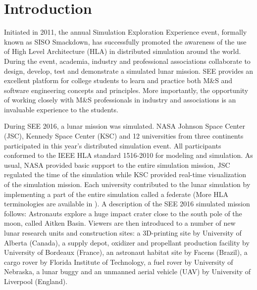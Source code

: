 \documentclass[conference]{IEEEtran}
\begin{document}
%
\IEEEpeerreviewmaketitle

\section{Introduction}
Initiated in 2011, the annual Simulation Exploration Experience event, formally known as SISO Smackdown, has successfully promoted the awareness of the use of High Level Architecture (HLA) in distributed simulation around the world. During the event, academia, industry and professional associations collaborate to design, develop, test and demonstrate a simulated lunar mission. SEE provides an excellent platform for college students to learn and practice both M\&S and software engineering concepts and principles. More importantly, the opportunity of working closely with M\&S professionals in industry and associations is an invaluable experience to the students. 

During SEE 2016, a lunar mission was simulated. NASA Johnson Space Center (JSC), Kennedy Space Center (KSC) and 12 universities from three continents participated in this year\rq{}s distributed simulation event. All participants conformed to the IEEE HLA standard 1516-2010 for modeling and simulation. As usual, NASA provided basic support to the entire simulation mission, JSC regulated the time of the simulation while KSC provided real-time visualization of the simulation mission. Each university contributed to the lunar simulation by implementing a part of the entire simulation called a federate (More HLA terminologies are available in \cite{HLA}). A description of the SEE 2016 simulated mission follows: Astronauts explore a huge impact crater close to the south pole of the moon, called Aitken Basin.  Viewers are then introduced to a number of new lunar research units and construction sites: a 3D-printing site by University of Alberta (Canada), a supply depot, oxidizer and propellant production facility by University of Bordeaux (France), an astronaut habitat site by Facens (Brazil), a cargo rover by Florida Institute of Technology, a fuel rover by University of Nebraska, a lunar buggy and an unmanned aerial vehicle (UAV) by University of Liverpool (England).
\end{document}
